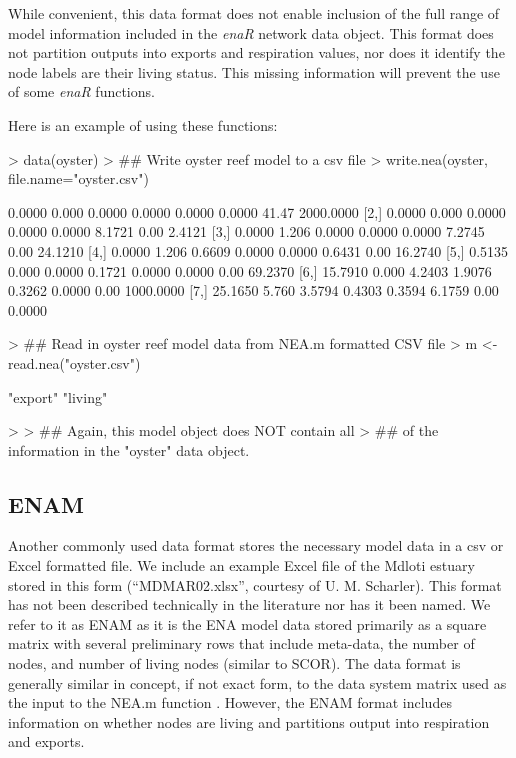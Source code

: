 \documentclass[article]{jss}
\begin{document}
While convenient, this data format does not enable inclusion of the
full range of model information included in the \textit{enaR} network
data object.  This format does not partition outputs into exports and
respiration values, nor does it identify the node labels are their
living status. This missing information will prevent the use of some
\textit{enaR} functions.

Here is an example of using these functions:
\begin{Schunk}
\begin{Sinput}
> data(oyster)
> ## Write oyster reef model to a csv file
> write.nea(oyster, file.name="oyster.csv")
\end{Sinput}
\begin{Soutput}
        [,1]  [,2]   [,3]   [,4]   [,5]   [,6]  [,7]      [,8]
[1,]  0.0000 0.000 0.0000 0.0000 0.0000 0.0000 41.47 2000.0000
[2,]  0.0000 0.000 0.0000 0.0000 0.0000 8.1721  0.00    2.4121
[3,]  0.0000 1.206 0.0000 0.0000 0.0000 7.2745  0.00   24.1210
[4,]  0.0000 1.206 0.6609 0.0000 0.0000 0.6431  0.00   16.2740
[5,]  0.5135 0.000 0.0000 0.1721 0.0000 0.0000  0.00   69.2370
[6,] 15.7910 0.000 4.2403 1.9076 0.3262 0.0000  0.00 1000.0000
[7,] 25.1650 5.760 3.5794 0.4303 0.3594 6.1759  0.00    0.0000
\end{Soutput}
\begin{Sinput}
> ## Read in oyster reef model data from NEA.m formatted CSV file
> m <- read.nea("oyster.csv")
\end{Sinput}
\begin{Soutput}
[1] "export" "living"
\end{Soutput}
\begin{Sinput}
> 
> ## Again, this model object does NOT contain all
> ## of the information in the "oyster" data object.
\end{Sinput}
\end{Schunk}

\subsection*{ENAM}

Another commonly used data format stores the necessary model data in a
csv or Excel formatted file.  We include an example Excel file of the
Mdloti estuary stored in this form (``MDMAR02.xlsx'', courtesy
of U. M. Scharler).  This format has not been described technically in
the literature nor has it been named.  We refer to it as ENAM as it is
the ENA model data stored primarily as a square matrix with several
preliminary rows that include meta-data, the number of nodes, and
number of living nodes (similar to SCOR).  The data format is
generally similar in concept, if not exact form, to the data system
matrix used as the input to the NEA.m function \citep{fath06}.
However, the ENAM format includes information on whether nodes are
living and partitions output into respiration and exports.
\end{document}
